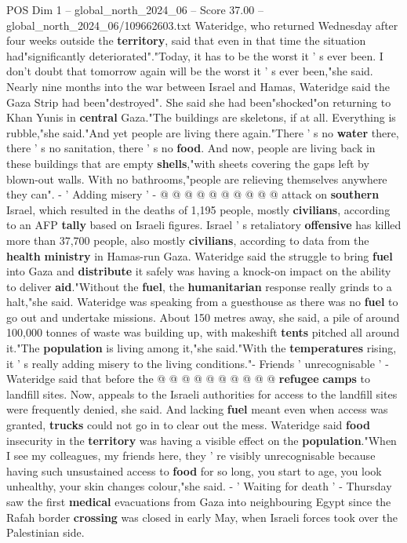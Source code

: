 \begin{textsample}{POS Dim 1 – global\_north\_2024\_06 – Score 37.00 – global\_north\_2024\_06/109662603.txt}  \label{ex:f1_pos_239}
Wateridge, who returned Wednesday after four weeks outside the \textbf{territory}, said that even in that time the situation had"significantly deteriorated"."Today, it has to be the worst it ' s ever been.
I don't doubt that tomorrow again will be the worst it ' s ever been,"she said.
Nearly nine months into the war between Israel and Hamas, Wateridge said the Gaza Strip had been"destroyed".
She said she had been"shocked"on returning to Khan Yunis in \textbf{central} Gaza."The buildings are skeletons, if at all.
Everything is rubble,"she said."And yet people are living there again."There ' s no \textbf{water} there, there ' s no sanitation, there ' s no \textbf{food}.
And now, people are living back in these buildings that are empty \textbf{shells},"with sheets covering the gaps left by blown-out walls.
With no bathrooms,"people are relieving themselves anywhere they can". - ' Adding misery ' - @ @ @ @ @ @ @ @ @ @ attack on \textbf{southern} Israel, which resulted in the deaths of 1,195 people, mostly \textbf{civilians}, according to an AFP \textbf{tally} based on Israeli figures.
Israel ' s retaliatory \textbf{offensive} has killed more than 37,700 people, also mostly \textbf{civilians}, according to data from the \textbf{health} \textbf{ministry} in Hamas-run Gaza.
Wateridge said the struggle to bring \textbf{fuel} into Gaza and \textbf{distribute} it safely was having a knock-on impact on the ability to deliver \textbf{aid}."Without the \textbf{fuel}, the \textbf{humanitarian} response really grinds to a halt,"she said.
Wateridge was speaking from a guesthouse as there was no \textbf{fuel} to go out and undertake missions.
About 150 metres away, she said, a pile of around 100,000 tonnes of waste was building up, with makeshift \textbf{tents} pitched all around it."The \textbf{population} is living among it,"she said."With the \textbf{temperatures} rising, it ' s really adding misery to the living conditions."- Friends ' unrecognisable ' - Wateridge said that before the @ @ @ @ @ @ @ @ @ @ \textbf{refugee} \textbf{camps} to landfill sites.
Now, appeals to the Israeli authorities for access to the landfill sites were frequently denied, she said.
And lacking \textbf{fuel} meant even when access was granted, \textbf{trucks} could not go in to clear out the mess.
Wateridge said \textbf{food} insecurity in the \textbf{territory} was having a visible effect on the \textbf{population}."When I see my colleagues, my friends here, they ' re visibly unrecognisable because having such unsustained access to \textbf{food} for so long, you start to age, you look unhealthy, your skin changes colour,"she said. - ' Waiting for death ' - Thursday saw the first \textbf{medical} evacuations from Gaza into neighbouring Egypt since the Rafah border \textbf{crossing} was closed in early May, when Israeli forces took over the Palestinian side.

\end{textsample}
